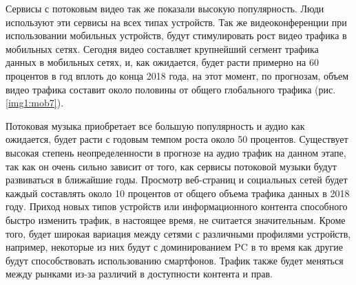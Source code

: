 Сервисы с потоковым видео так же показали высокую популярность. Люди используют эти сервисы на всех типах устройств. Так же видеоконференции при использовании мобильных устройств, будут стимулировать рост видео трафика в мобильных сетях. Сегодня видео составляет крупнейший сегмент трафика данных в мобильных сетях, и, как ожидается, будет расти примерно на 60 процентов в год вплоть до конца 2018 года, на этот момент, по прогнозам, объем видео трафика составит около половины от общего глобального трафика (рис. \ref{img1:mob7}).

Потоковая музыка приобретает все большую популярность и аудио как ожидается, будет расти с годовым темпом роста около 50 процентов. Существует высокая степень неопределенности в прогнозе на аудио трафик на данном этапе, так как он очень сильно зависит от того, как сервисы потоковой музыки будут развиваться в ближайшие годы.
Просмотр веб-страниц и социальных сетей будет каждый составлять около 10 процентов от общего объема трафика данных в 2018 году.
Приход новых типов устройств или информационного контента способного быстро изменить трафик, в настоящее время, не считается значительным. Кроме того, будет широкая вариация между сетями с различными профилями устройств, например, некоторые из них будут с доминированием PC в то время как другие будут способствовать использованию смартфонов. Трафик также будет меняться между рынками из-за различий в доступности контента и прав. 

